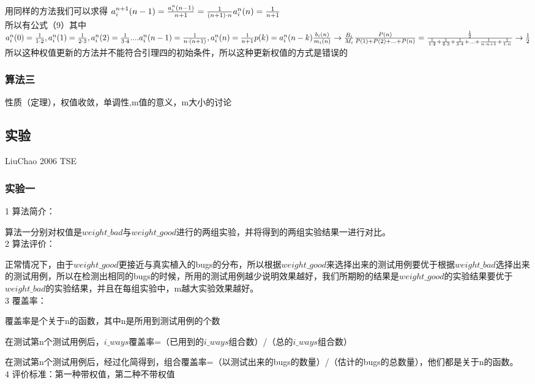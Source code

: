 \documentclass[10pt,journal,letterpaper,compsoc]{IEEEtran}
\def\a{{\alpha}}
\begin{document}
\begin{CJK}{UTF8}{gkai}
\\用同样的方法我们可以求得
$a_i^{n+1}(n-1)=\frac{a_i^n(n-1)}{n+1}=\frac{1}{(n+1) \cdot n}
\\a_i^n(n)=\frac{1}{n+1}$
\\所以有公式（9）其中
$\\a_i^n(0)=\frac{1}{1 \cdot 2},a_i^n(1)=
\frac{1}{2 \cdot 3},a_i^n(2)=\frac{1}{3 \cdot 4}....a_i^n(n-1)
=\frac{1}{n \cdot (n+1)},a_i^n(n)=\frac{1}{n+1}
\\p(k)=a_i^n(n-k)
\frac{b_i(n)}{m_i(n)} \rightarrow \frac{B_i}{M_i}
\frac{P(n)}{P(1)+P(2)+...+P(n)}=
\frac{\frac{1}{2}}{\frac{1}{1 \cdot 2}+\frac{1}{2 \cdot 3}+\frac{1}{3 \cdot 4}+...
+\frac{1}{n \cdot n+1}+\frac{1}{1 \cdot n}} \rightarrow \frac{1}{2}$
\\所以这种权值更新的方法并不能符合引理四的初始条件，所以这种更新权值的方式是错误的
    \subsubsection{ 算法三}性质（定理），权值收敛，单调性,m值的意义，m大小的讨论
\subsection{实验}LiuChao 2006 TSE
	\subsubsection{实验一}
1 算法简介：

	算法一分别对权值是$weight\_bad$与$weight\_good$进行的两组实验，并将得到的两组实验结果一进行对比。
\\2 算法评价：

	正常情况下，由于$weight\_good$更接近与真实植入的bugs的分布，所以根据$weight\_good$来选择出来的测试用例要优于根据$weight\_bad$选择出来的测试用例，所以在检测出相同的bugs的时候，所用的测试用例越少说明效果越好，我们所期盼的结果是$weight\_good$的实验结果要优于$weight\_bad$的实验结果，并且在每组实验中，m越大实验效果越好。
\\3 覆盖率：

	覆盖率是个关于n的函数，其中n是所用到测试用例的个数

	在测试第n个测试用例后，$i\_ways$覆盖率=（已用到的$i\_ways$组合数）/（总的$i\_ways$组合数）

	在测试第n个测试用例后，经过化简得到，组合覆盖率=（以测试出来的bugs的数量）/（估计的bugs的总数量），他们都是关于n的函数。
\\4 评价标准：第一种带权值，第二种不带权值


\end{CJK}
\end{document}
